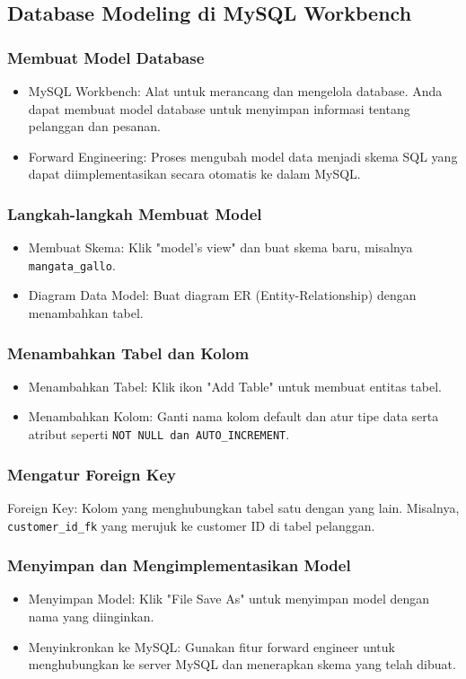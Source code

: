\documentclass{article}
\begin{document}
\subsection{Database Modeling di MySQL Workbench}
\subsubsection{Membuat Model Database}
\begin{itemize}
    \item MySQL Workbench: Alat untuk merancang dan mengelola database. Anda dapat membuat model database untuk menyimpan informasi tentang pelanggan dan pesanan.
    \item Forward Engineering: Proses mengubah model data menjadi skema SQL yang dapat diimplementasikan secara otomatis ke dalam MySQL.
\end{itemize}

\subsubsection{Langkah-langkah Membuat Model}
\begin{itemize}
    \item Membuat Skema: Klik "model's view" dan buat skema baru, misalnya \verb|mangata_gallo|.
    \item Diagram Data Model: Buat diagram ER (Entity-Relationship) dengan menambahkan tabel.
\end{itemize}

\subsubsection{Menambahkan Tabel dan Kolom}
\begin{itemize}
    \item Menambahkan Tabel: Klik ikon "Add Table" untuk membuat entitas tabel.
    \item Menambahkan Kolom: Ganti nama kolom default dan atur tipe data serta atribut seperti \verb|NOT NULL dan AUTO_INCREMENT|.
\end{itemize}

\subsubsection{Mengatur Foreign Key}
Foreign Key: Kolom yang menghubungkan tabel satu dengan yang lain. Misalnya, \verb|customer_id_fk| yang merujuk ke customer ID di tabel pelanggan.

\subsubsection{Menyimpan dan Mengimplementasikan Model}
\begin{itemize}
    \item Menyimpan Model: Klik "File Save As" untuk menyimpan model dengan nama yang diinginkan.
    \item Menyinkronkan ke MySQL: Gunakan fitur forward engineer untuk menghubungkan ke server MySQL dan menerapkan skema yang telah dibuat.
\end{itemize}
\end{document}
